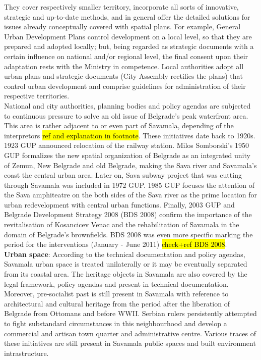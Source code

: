 \documentclass[11pt]{report}
\begin{document}
\begin{itemize}
They cover respectively smaller territory, incorporate all sorts of innovative, strategic and up-to-date methods, and in general offer the detailed solutions for issues already conceptually covered with spatial plans.
For example, General Urban Development Plans control development on a local level, so that they are prepared and adopted locally; but, being regarded as strategic documents with a certain influence on national and/or regional level, the final consent upon their adaptation rests with the Ministry in competence.
Local authorities adopt all urban plans and strategic documents (City Assembly rectifies the plans) that control urban development and comprise guidelines for administration of their respective territories.
\\
National and city authorities, planning bodies and policy agendas are subjected to continuous pressure to solve an old issue of Belgrade’s peak waterfront area. This area is rather adjacent to or even part of Savamala, depending of the interpretors \hl{ref and explanation in footnote}. These initiatives date back to 1920s.
1923 GUP announced relocation of the railway station.
Milos Somborski's 1950 GUP formalizes the new spatial organization of Belgrade as an integrated unity of Zemun, New Belgrade and old Belgrade, making the Sava river and Savamala's coast the central urban area.
Later on, Sava subway project that was cutting through Savamala was included in 1972 GUP.
1985 GUP focuses the attention of the Sava amphiteatre on the both sides of the Sava river as the prime location for urban redevelopment with central urban functions.
Finally, 2003 GUP and Belgrade Development Strategy 2008 (BDS 2008) confirm the importance of the revitalisation of Kosancicev Venac and the rehabilitation of Savamala in the domain of Belgrade’s brownfields. BDS 2008 was even more specific marking the period for the interventions (January - June 2011) \hl{check+ref BDS 2008}.
\\
\textbf{Urban space}:
According to the technical documentation and policy agendas, Savamala urban space is treated unilaterally or it may be eventually separated from its coastal area. The heritage objects in Savamala are also covered by the legal framework, policy agendas and present in technical documentation.
Moreover, pre-socialist past is still present in Savamala with reference to architectural and cultural heritage from the period after the liberation of Belgrade from Ottomans and before WWII. Serbian rulers persistently attempted to fight substandard circumstances in this neighbourhood and develop a commercial and artisan town quarter and administrative centre. Various traces of these initiatives are still present in Savamala public spaces and built environment intrastructure.  

\end{itemize}
\end{document}
